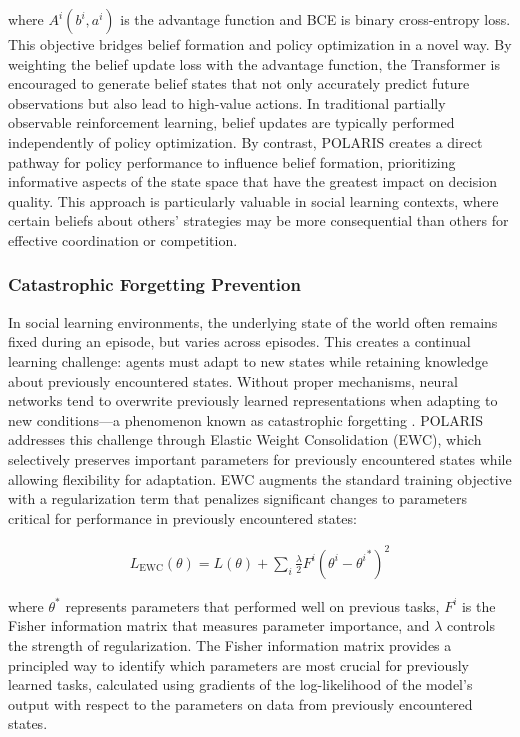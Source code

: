 \documentclass[a4paper,12pt]{report}
\begin{document}
where $A^i(b^i, a^i)$ is the advantage function and BCE is binary cross-entropy loss. This objective bridges belief formation and policy optimization in a novel way. By weighting the belief update loss with the advantage function, the Transformer is encouraged to generate belief states that not only accurately predict future observations but also lead to high-value actions. In traditional partially observable reinforcement learning, belief updates are typically performed independently of policy optimization. By contrast, POLARIS creates a direct pathway for policy performance to influence belief formation, prioritizing informative aspects of the state space that have the greatest impact on decision quality. This approach is particularly valuable in social learning contexts, where certain beliefs about others' strategies may be more consequential than others for effective coordination or competition.

\subsubsection{Catastrophic Forgetting Prevention}

In social learning environments, the underlying state of the world often remains fixed during an episode, but varies across episodes. This creates a continual learning challenge: agents must adapt to new states while retaining knowledge about previously encountered states. Without proper mechanisms, neural networks tend to overwrite previously learned representations when adapting to new conditions—a phenomenon known as catastrophic forgetting \citep{vandeven2024continuallearningcatastrophicforgetting}. POLARIS addresses this challenge through Elastic Weight Consolidation (EWC), which selectively preserves important parameters for previously encountered states while allowing flexibility for adaptation. EWC augments the standard training objective with a regularization term that penalizes significant changes to parameters critical for performance in previously encountered states:

\begin{align}
    L_{\text{EWC}}(\theta) = L(\theta) + \sum_i \frac{\lambda}{2} F^i (\theta^i - {\theta^i}^*)^2
\end{align}

where $\theta^*$ represents parameters that performed well on previous tasks, $F^i$ is the Fisher information matrix that measures parameter importance, and $\lambda$ controls the strength of regularization. The Fisher information matrix provides a principled way to identify which parameters are most crucial for previously learned tasks, calculated using gradients of the log-likelihood of the model's output with respect to the parameters on data from previously encountered states.
\end{document}
